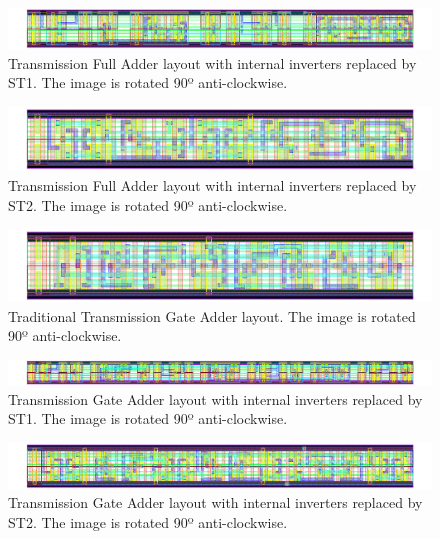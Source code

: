 \documentclass[diss,pgmicro,english]{iiufrgs}
\begin{document}
\newpage
\begin{figure}[]
\centering
\includegraphics[width=1.5\textwidth, angle =90]{TFAST1.png}
\caption{Transmission Full Adder layout with internal inverters replaced by ST1. The image is rotated 90º anti-clockwise.}
\label{fig:TFAST1}
\end{figure}

\newpage
\begin{figure}[]
\centering
\includegraphics[width=1.5\textwidth, angle =90]{TFAST2.png}
\caption{Transmission Full Adder layout with internal inverters replaced by ST2. The image is rotated 90º anti-clockwise.}
\label{fig:TFAST2}
\end{figure}






\newpage


\begin{figure}[]
\centering
\includegraphics[width=1.5\textwidth, angle =90]{TGA.png}
\caption{Traditional Transmission Gate Adder layout. The image is rotated 90º anti-clockwise.}
\label{fig:TGA}
\end{figure}

\newpage
\begin{figure}[]
\centering
\includegraphics[width=1.5\textwidth, angle =90]{TGAST1.png}
\caption{Transmission Gate Adder layout with internal inverters replaced by ST1. The image is rotated 90º anti-clockwise.}
\label{fig:TGAST1}
\end{figure}

\newpage
\begin{figure}[]
\centering
\includegraphics[width=1.5\textwidth, angle =90]{TGAST2.png}
\caption{Transmission Gate Adder layout with internal inverters replaced by ST2. The image is rotated 90º anti-clockwise.}
\label{fig:TGAST2}
\end{figure}
\end{document}
